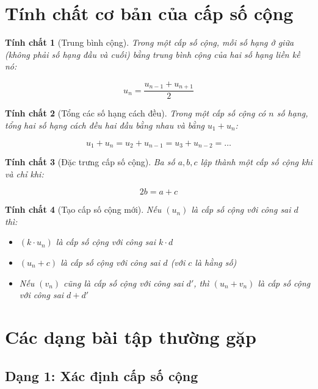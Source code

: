 \documentclass[12pt,a4paper]{report}
\newtheorem{property}{Tính chất}[section]
\begin{document}
\section{Tính chất cơ bản của cấp số cộng}

\begin{property}[Trung bình cộng]
    Trong một cấp số cộng, mỗi số hạng ở giữa (không phải số hạng đầu và cuối) bằng trung bình cộng của hai số hạng liền kề nó:
    
    \[
        u_n = \frac{u_{n-1} + u_{n+1}}{2}
    \]
\end{property}

\begin{property}[Tổng các số hạng cách đều]
    Trong một cấp số cộng có $n$ số hạng, tổng hai số hạng cách đều hai đầu bằng nhau và bằng $u_1 + u_n$:
    
    \[
        u_1 + u_n = u_2 + u_{n-1}
        = u_3 + u_{n-2} = \dots
    \]
\end{property}

\begin{property}[Đặc trưng cấp số cộng]
    Ba số $a, b, c$ lập thành một cấp số cộng khi và chỉ khi:
    
    \[
        2b = a + c
    \]
\end{property}

\begin{property}[Tạo cấp số cộng mới]
    Nếu $(u_n)$ là cấp số cộng với công sai $d$ thì:
    
    \begin{itemize}[label=\textbullet]
        \item $(k \cdot u_n)$ là cấp số cộng với công sai $k \cdot d$
        \item $(u_n + c)$ là cấp số cộng với công sai $d$ (với $c$ là hằng số)
        \item Nếu $(v_n)$ cũng là cấp số cộng với công sai $d'$, thì $(u_n + v_n)$ là cấp số cộng với công sai $d + d'$
    \end{itemize}
\end{property}

\section{Các dạng bài tập thường gặp}

\subsection{Dạng 1: Xác định cấp số cộng}
\end{document}
